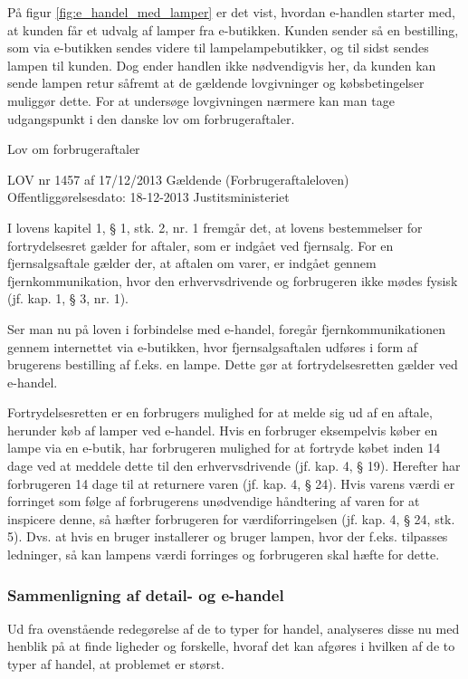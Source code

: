 På figur \ref{fig:e_handel_med_lamper} er det vist, hvordan e-handlen starter med, at kunden får et udvalg af lamper fra e-butikken. Kunden sender så en bestilling, som via e-butikken sendes videre til lampelampebutikker, og til sidst sendes lampen til kunden. Dog ender handlen ikke nødvendigvis her, da kunden kan sende lampen retur såfremt at de gældende lovgivninger og købsbetingelser muliggør dette. For at undersøge lovgivningen nærmere kan man tage udgangspunkt i den danske lov om forbrugeraftaler\cite{retsinformationen}.

%
Lov om forbrugeraftaler

LOV nr 1457 af 17/12/2013 Gældende
(Forbrugeraftaleloven)
Offentliggørelsesdato: 18-12-2013
Justitsministeriet
%

I lovens kapitel 1, § 1, stk. 2, nr. 1 fremgår det, at lovens bestemmelser for fortrydelsesret gælder for aftaler, som er indgået ved fjernsalg. For en  fjernsalgsaftale gælder der, at aftalen om varer, er indgået gennem fjernkommunikation, hvor den erhvervsdrivende og forbrugeren ikke mødes fysisk (jf. kap. 1, § 3, nr. 1).

Ser man nu på loven i forbindelse med e-handel, foregår fjernkommunikationen gennem internettet via e-butikken, hvor fjernsalgsaftalen udføres i form af brugerens bestilling af f.eks. en lampe. Dette gør at fortrydelsesretten gælder ved e-handel.

Fortrydelsesretten er en forbrugers mulighed for at melde sig ud af en aftale, herunder køb af lamper ved e-handel. Hvis en forbruger eksempelvis køber en lampe via en e-butik, har forbrugeren mulighed for at fortryde købet inden 14 dage ved at meddele dette til den erhvervsdrivende (jf. kap. 4, § 19). Herefter har forbrugeren 14 dage til at returnere varen (jf. kap. 4, § 24). Hvis varens værdi er forringet som følge af forbrugerens unødvendige håndtering af varen for at inspicere denne, så hæfter forbrugeren for værdiforringelsen (jf. kap. 4, § 24, stk. 5). Dvs. at hvis en bruger installerer og bruger lampen, hvor der f.eks. tilpasses ledninger, så kan lampens værdi forringes og forbrugeren skal hæfte for dette. 

\subsubsection{Sammenligning af detail- og e-handel}
Ud fra ovenstående redegørelse af de to typer for handel, analyseres disse nu med henblik på at finde ligheder og forskelle, hvoraf det kan afgøres i hvilken af de to typer af handel, at problemet er størst. 

